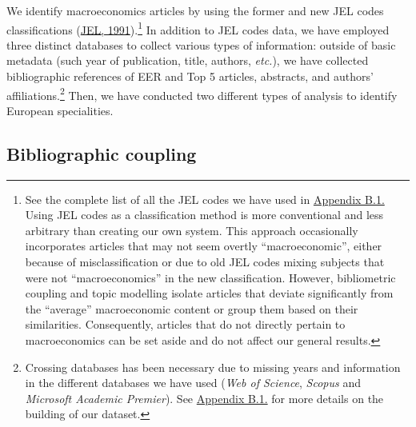 \documentclass[
  12pt,
  onecolumn]{article}
\begin{document}
We identify macroeconomics articles by using the former and new JEL
codes classifications (\protect\hyperlink{ref-jel1991}{JEL,
1991}).\footnote{See the complete list of all the JEL codes we have used
  in \protect\hyperlink{eer-top5-macro}{Appendix B.1.} Using JEL codes
  as a classification method is more conventional and less arbitrary
  than creating our own system. This approach occasionally incorporates
  articles that may not seem overtly ``macroeconomic'', either because
  of misclassification or due to old JEL codes mixing subjects that were
  not ``macroeconomics'' in the new classification. However,
  bibliometric coupling and topic modelling isolate articles that
  deviate significantly from the ``average'' macroeconomic content or
  group them based on their similarities. Consequently, articles that do
  not directly pertain to macroeconomics can be set aside and do not
  affect our general results.} In addition to JEL codes data, we have
employed three distinct databases to collect various types of
information: outside of basic metadata (such year of publication, title,
authors, \emph{etc.}), we have collected bibliographic references of EER
and Top 5 articles, abstracts, and authors' affiliations.\footnote{Crossing
  databases has been necessary due to missing years and information in
  the different databases we have used (\emph{Web of Science},
  \emph{Scopus} and \emph{Microsoft Academic Premier}). See
  \protect\hyperlink{corpus}{Appendix B.1.} for more details on the
  building of our dataset.} Then, we have conducted two different types
of analysis to identify European specialities.

\hypertarget{bibliographic-coupling}{%
\subsection{Bibliographic coupling}\label{bibliographic-coupling}}
\end{document}
